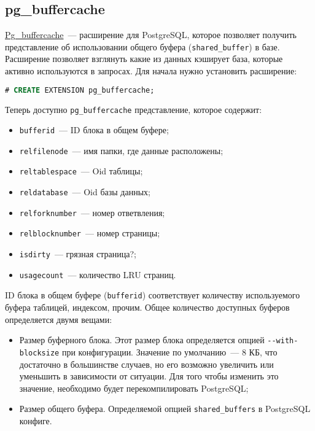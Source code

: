 \subsection{pg\_buffercache}

\href{http://www.postgresql.org/docs/current/static/pgbuffercache.html}{Pg\_buffercache}~--- расширение для PostgreSQL, которое позволяет получить представление об использовании общего буфера (\lstinline!shared_buffer!) в базе. Расширение позволяет взглянуть какие из данных кэширует база, которые активно используются в запросах. Для начала нужно установить расширение:

\begin{lstlisting}[language=SQL,label=lst:pgbuffercache1,caption=pg\_buffercache]
# CREATE EXTENSION pg_buffercache;
\end{lstlisting}

Теперь доступно \lstinline!pg_buffercache! представление, которое содержит:

\begin{itemize}
  \item \lstinline!bufferid!~--- ID блока в общем буфере;
  \item \lstinline!relfilenode!~--- имя папки, где данные расположены;
  \item \lstinline!reltablespace!~--- Oid таблицы;
  \item \lstinline!reldatabase!~--- Oid базы данных;
  \item \lstinline!relforknumber!~--- номер ответвления;
  \item \lstinline!relblocknumber!~--- номер страницы;
  \item \lstinline!isdirty!~--- грязная страница?;
  \item \lstinline!usagecount!~--- количество LRU страниц.
\end{itemize}

ID блока в общем буфере (\lstinline!bufferid!) соответствует количеству используемого буфера таблицей, индексом, прочим. Общее количество доступных буферов определяется двумя вещами:

\begin{itemize}
  \item Размер буферного блока. Этот размер блока определяется опцией \lstinline!--with-blocksize! при конфигурации. Значение по умолчанию~--- 8 КБ, что достаточно в большинстве случаев, но его возможно увеличить или уменьшить в зависимости от ситуации. Для того чтобы изменить это значение, необходимо будет перекомпилировать PostgreSQL;
  \item Размер общего буфера. Определяемой опцией \lstinline!shared_buffers! в PostgreSQL конфиге.
\end{itemize}


